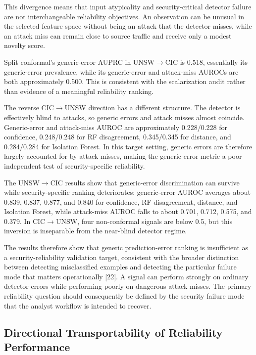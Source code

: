 \documentclass[conference]{IEEEtran}
\begin{document}
This divergence means that input atypicality and security-critical detector failure are not interchangeable reliability objectives. An observation can be unusual in the selected feature space without being an attack that the detector misses, while an attack miss can remain close to source traffic and receive only a modest novelty score.

Split conformal's generic-error AUPRC in UNSW$\rightarrow$CIC is 0.518, essentially its generic-error prevalence, while its generic-error and attack-miss AUROCs are both approximately 0.500. This is consistent with the scalarization audit rather than evidence of a meaningful reliability ranking.

The reverse CIC$\rightarrow$UNSW direction has a different structure. The detector is effectively blind to attacks, so generic errors and attack misses almost coincide. Generic-error and attack-miss AUROC are approximately 0.228/0.228 for confidence, 0.248/0.248 for RF disagreement, 0.345/0.345 for distance, and 0.284/0.284 for Isolation Forest. In this target setting, generic errors are therefore largely accounted for by attack misses, making the generic-error metric a poor independent test of security-specific reliability.

The UNSW$\rightarrow$CIC results show that generic-error discrimination can survive while security-specific ranking deteriorates: generic-error AUROC averages about 0.839, 0.837, 0.877, and 0.840 for confidence, RF disagreement, distance, and Isolation Forest, while attack-miss AUROC falls to about 0.701, 0.712, 0.575, and 0.379. In CIC$\rightarrow$UNSW, four non-conformal signals are below 0.5, but this inversion is inseparable from the near-blind detector regime.

The results therefore show that generic prediction-error ranking is insufficient as a security-reliability validation target, consistent with the broader distinction between detecting misclassified examples and detecting the particular failure mode that matters operationally [22]. A signal can perform strongly on ordinary detector errors while performing poorly on dangerous attack misses. The primary reliability question should consequently be defined by the security failure mode that the analyst workflow is intended to recover.

\subsection{Directional Transportability of Reliability Performance}
\end{document}
